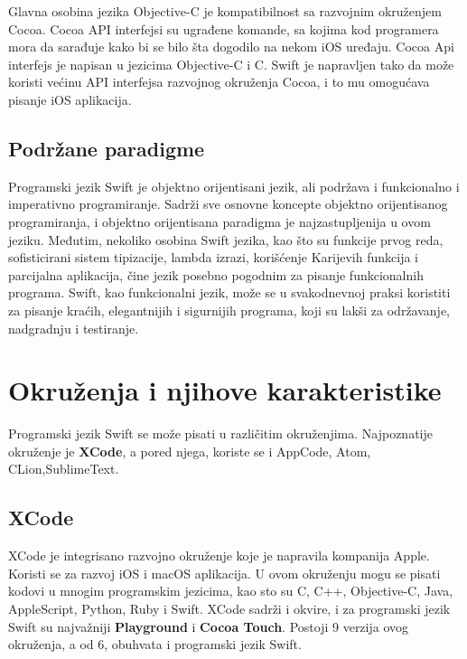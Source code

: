 \documentclass[a4paper]{article}
\begin{document}
Glavna osobina jezika Objective-C je kompatibilnost sa razvojnim okruženjem Cocoa.
Cocoa API interfejsi su ugrađene komande, sa kojima kod programera mora da sarađuje kako bi
se bilo šta dogodilo na nekom iOS uređaju. Cocoa Api interfejs je napisan u jezicima Objective-C i C. Swift je napravljen tako da može koristi većinu API interfejsa razvojnog okruženja Cocoa, i
to mu omogućava pisanje iOS aplikacija. 





\subsection{Podržane paradigme}
\label{subsec:podnaslovParadigma}

Programski jezik Swift je objektno orijentisani jezik, ali podržava i funkcionalno i imperativno
programiranje. Sadrži sve osnovne koncepte objektno orijentisanog programiranja, i objektno orijentisana paradigma je najzastupljenija u ovom jeziku. Međutim, nekoliko osobina Swift jezika, kao što su funkcije prvog reda, sofisticirani sistem tipizacije, lambda izrazi, korišćenje Karijevih funkcija i parcijalna aplikacija, čine jezik posebno pogodnim za pisanje funkcionalnih programa. Swift, kao funkcionalni jezik, može se u svakodnevnoj praksi koristiti za pisanje kraćih, elegantnijih i sigurnijih programa, koji su lakši za održavanje, nadgradnju i testiranje.




\section{Okruženja i njihove karakteristike}	
\label{sec:cetvrtiDeo}

Programski jezik Swift se može pisati u različitim okruženjima. Najpoznatije okruženje je \textbf{XCode}, a pored njega, koriste se i AppCode, Atom, CLion,SublimeText.

\subsection{XCode}
\label{subsec:podnaslovXCode}



XCode je integrisano razvojno okruženje koje je napravila kompanija Apple. Koristi se za razvoj iOS i macOS aplikacija. U ovom okruženju mogu se pisati kodovi u mnogim programskim jezicima, kao sto su C, C++, Objective-C, Java, AppleScript, Python, Ruby i Swift. XCode sadrži i okvire, i za programski jezik Swift su najvažniji \textbf{Playground} i \textbf{Cocoa Touch}. 
Postoji 9 verzija ovog okruženja, a od 6, obuhvata i programski jezik Swift.
\vspace{3mm}
\end{document}
